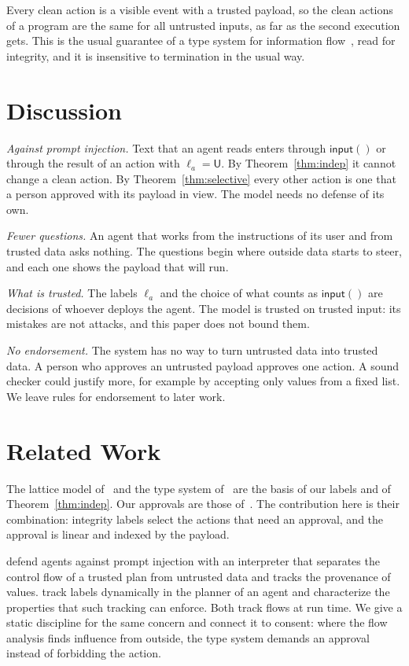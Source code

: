 \documentclass[acmsmall,nonacm,screen]{acmart}
\newcommand{\kw}[1]{\mathsf{#1}}
\newcommand{\inp}{\kw{input}()}
\newcommand{\U}{\kw{U}}
\begin{document}
Every clean action is a visible event with a trusted payload, so the clean actions of a program
are the same for all untrusted inputs, as far as the second execution gets. This is the usual
guarantee of a type system for information flow~\citep{volpano1996}, read for integrity, and it
is insensitive to termination in the usual way.

\section{Discussion}

\emph{Against prompt injection.} Text that an agent reads enters through $\inp$ or through the
result of an action with $\ell_a = \U$. By Theorem~\ref{thm:indep} it cannot change a clean
action. By Theorem~\ref{thm:selective} every other action is one that a person approved with
its payload in view. The model needs no defense of its own.

\emph{Fewer questions.} An agent that works from the instructions of its user and from trusted
data asks nothing. The questions begin where outside data starts to steer, and each one shows
the payload that will run.

\emph{What is trusted.} The labels $\ell_a$ and the choice of what counts as $\inp$ are
decisions of whoever deploys the agent. The model is trusted on trusted input: its mistakes are
not attacks, and this paper does not bound them.

\emph{No endorsement.} The system has no way to turn untrusted data into trusted data. A person
who approves an untrusted payload approves one action. A sound checker could justify more, for
example by accepting only values from a fixed list. We leave rules for endorsement to later
work.

\section{Related Work}

The lattice model of~\citet{denning1976} and the type system of~\citet{volpano1996} are the basis
of our labels and of Theorem~\ref{thm:indep}. Our approvals are those of~\citet{tpp4}. The
contribution here is their combination: integrity labels select the actions that need an
approval, and the approval is linear and indexed by the payload.

\citet{debenedetti2025} defend agents against prompt injection with an interpreter that
separates the control flow of a trusted plan from untrusted data and tracks the provenance of
values. \citet{costa2025} track labels dynamically in the planner of an agent and characterize
the properties that such tracking can enforce. Both track flows at run time. We give a static
discipline for the same concern and connect it to consent: where the flow analysis finds
influence from outside, the type system demands an approval instead of forbidding the action.
\end{document}
